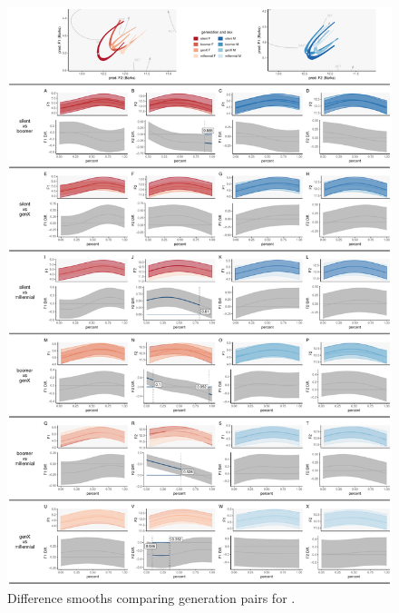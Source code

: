 \begin{figure}[p]
    \centering
    \includegraphics[width=\textwidth]{Figures/BIN/BIN_detailed_generation_panel_plot.pdf}
    \caption{Difference smooths comparing generation pairs for \bin.}
    \label{fig:bin_diff_smooths_gen}
\end{figure}

